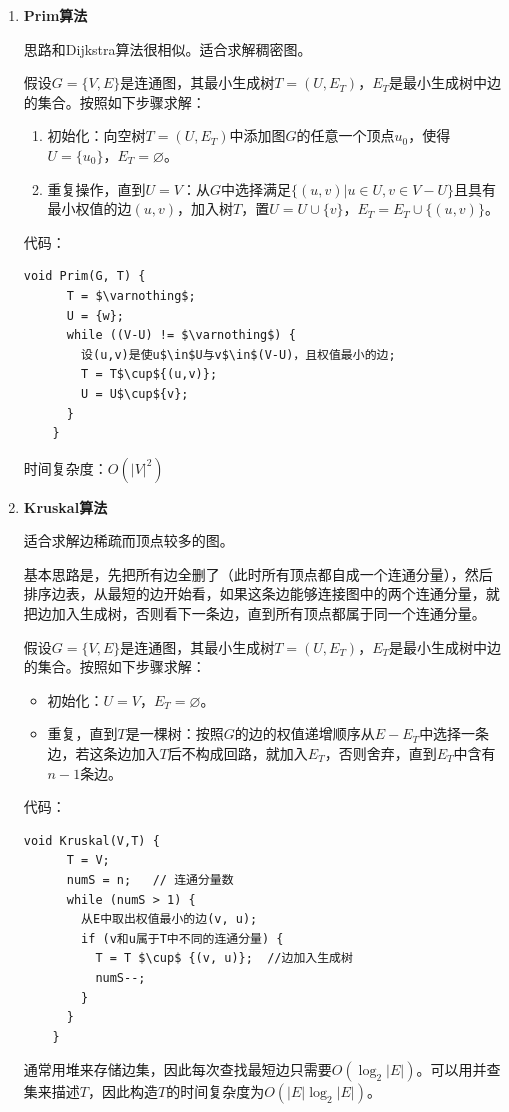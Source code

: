 \documentclass[12pt, a4paper, oneside]{ctexart}
\begin{document}
\begin{enumerate}
  \item {\bf Prim算法}
  
  思路和Dijkstra算法很相似。适合求解稠密图。

  假设$G=\{V,E\}$是连通图，其最小生成树$T=(U,E_T)$，$E_T$是最小生成树中边的集合。按照如下步骤求解：
  \begin{enumerate}
    \item 初始化：向空树$T=(U,E_T)$中添加图$G$的任意一个顶点$u_0$，使得$U=\{u_0\}$，$E_T=\varnothing$。
    \item 重复操作，直到$U=V$：从$G$中选择满足$\{(u,v)\vert u\in U,v\in V-U\}$且具有最小权值的边$(u,v)$，加入树$T$，置$U=U\cup \{v\}$，$E_T=E_T\cup \{(u,v)\}$。
  \end{enumerate}

  代码：
  \begin{lstlisting}[mathescape]
    void Prim(G, T) {
      T = $\varnothing$;
      U = {w};
      while ((V-U) != $\varnothing$) {
        设(u,v)是使u$\in$U与v$\in$(V-U)，且权值最小的边;
        T = T$\cup${(u,v)};
        U = U$\cup${v};
      }
    }
  \end{lstlisting}

  时间复杂度：$O(\lvert V\rvert ^2)$

  \item {\bf Kruskal算法}
  
  适合求解边稀疏而顶点较多的图。

  基本思路是，先把所有边全删了（此时所有顶点都自成一个连通分量），然后排序边表，从最短的边开始看，如果这条边能够连接图中的两个连通分量，就把边加入生成树，否则看下一条边，直到所有顶点都属于同一个连通分量。

  假设$G=\{V,E\}$是连通图，其最小生成树$T=(U,E_T)$，$E_T$是最小生成树中边的集合。按照如下步骤求解：
  \begin{itemize}
    \item 初始化：$U=V$，$E_T=\varnothing$。
    \item 重复，直到$T$是一棵树：按照$G$的边的权值递增顺序从$E-E_T$中选择一条边，若这条边加入$T$后不构成回路，就加入$E_T$，否则舍弃，直到$E_T$中含有$n-1$条边。
  \end{itemize}

  代码：
  \begin{lstlisting}[mathescape]
    void Kruskal(V,T) {
      T = V;
      numS = n;   // 连通分量数
      while (numS > 1) {
        从E中取出权值最小的边(v, u);
        if (v和u属于T中不同的连通分量) {
          T = T $\cup$ {(v, u)};  //边加入生成树
          numS--;
        }
      }
    }
  \end{lstlisting}

  通常用堆来存储边集，因此每次查找最短边只需要$O(\log_2\lvert E\rvert)$。可以用并查集来描述$T$，因此构造$T$的时间复杂度为$O(\lvert E\rvert\log_2\lvert E\rvert)$。
\end{enumerate}
\end{document}
